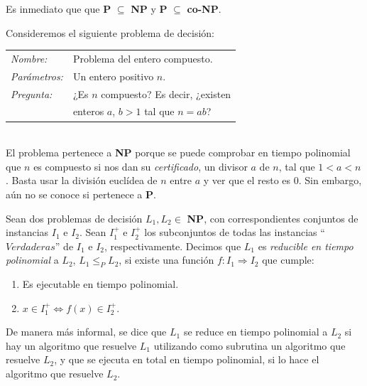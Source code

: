 Es inmediato que  que \textbf{P} $\subseteq$ \textbf{NP} y \textbf{P} $\subseteq$ \textbf{co-NP}.

\begin{example}
	Consideremos el siguiente problema de decisión:
	
	\begin{tabular}{|ll}
		\textit{Nombre:} & Problema del entero compuesto. \\
		\textit{Parámetros:} & Un entero positivo $n$. \\
		\textit{Pregunta:} & ¿Es $n$ compuesto? Es decir, ¿existen \\
		&  enteros $a$, $b > 1$ tal que $n=ab$? \\
	\end{tabular}
	\\
	
	El problema pertenece a \textbf{NP} porque se puede comprobar en tiempo polinomial que $n$ es compuesto si nos dan su \textit{certificado}, un divisor $a$ de $n$, tal que $1 < a < n$. Basta usar la división euclídea de $n$ entre $a$ y ver que el resto es $0$. Sin embargo, aún no se conoce si pertenece a \textbf{P}.
\end{example}


\hfil

\begin{definition}
	\label{reducePoly:def}
	Sean dos problemas de decisión $L_1, L_2 \in $ \textbf{NP}, con correspondientes conjuntos de instancias $I_1$ e $I_2$. Sean $I_1^+$ e $I_2^+$ los subconjuntos de todas las instancias ``$Verdaderas$'' de $I_1$ e $I_2$, respectivamente. Decimos que $L_1$ es \textit{reducible en tiempo polinomial} a $L_2$, $L_1 \leq_P L_2$, si existe una función $f:I_1 \Rightarrow I_2$ que cumple:
	
	\begin{enumerate}
		\item Es ejecutable en tiempo polinomial.
		\item $x \in I_1^+  \Leftrightarrow  f(x) \in I_2^+ $.
	\end{enumerate}
\end{definition}

\hfil

De manera más informal, se dice que $L_1$ se reduce en tiempo polinomial a $L_2$ si hay un algoritmo que resuelve $L_1$ utilizando como subrutina un algoritmo que resuelve $L_2$, y que se ejecuta en total en tiempo polinomial, si lo hace el algoritmo que resuelve $L_2$.

